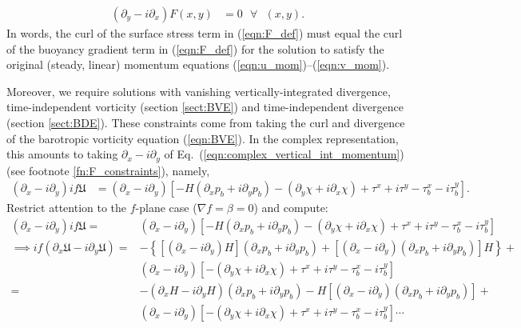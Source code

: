 \documentclass[10pt]{amsart}
\begin{document}
\begin{align}
\left( \partial_y - i \partial_x \right)F(x,y) & = 0 \text{~~} \forall \text{~~} (x,y) .
\end{align}
In words, the curl of the surface stress term in (\ref{eqn:F_def}) must equal the curl of the buoyancy gradient term in (\ref{eqn:F_def}) for the solution to satisfy the original (steady, linear) momentum equations (\ref{eqn:u_mom})--(\ref{eqn:v_mom}).

Moreover, we require solutions with vanishing vertically-integrated divergence, time-independent vorticity (section \ref{sect:BVE}) and time-independent divergence (section \ref{sect:BDE}).
These constraints come from taking the curl and divergence of the barotropic vorticity equation (\ref{eqn:BVE}).
In the complex representation, this amounts to taking $\partial_x - i \partial_y$ of Eq.~(\ref{eqn:complex_vertical_int_momentum}) (see footnote \ref{fn:F_constraints}), namely,
\begin{align}
\left( \partial_x - i \partial_y \right)i f \mathfrak{U} & = \left( \partial_x - i \partial_y \right) \left[- H \left(\partial_x p_b + i \partial_y p_b \right) - \left(\partial_y \chi  + i \partial_x \chi  \right)  + \tau^x + i \tau^y  - \tau^x_b - i \tau^y_b \right].
\end{align}
Restrict attention to the $f$-plane case ($\nabla f = \beta=0$) and compute:
\begin{align}
\left( \partial_x - i \partial_y \right)i f \mathfrak{U} = & \left( \partial_x - i \partial_y \right) \left[- H \left(\partial_x p_b + i \partial_y p_b \right) - \left(\partial_y \chi  + i \partial_x \chi  \right)  + \tau^x + i \tau^y  - \tau^x_b - i \tau^y_b \right] \nonumber \\
\implies
i f \left( \partial_x \mathfrak{U} - i \partial_y \mathfrak{U} \right) = &
-\left\{ \left[\left( \partial_x - i \partial_y \right) H\right] \left(\partial_x p_b + i \partial_y p_b \right) + \left[\left( \partial_x - i \partial_y \right) \left(\partial_x p_b + i \partial_y  p_b  \right) \right] H    \right\}+ \nonumber \\
&\left( \partial_x - i \partial_y \right)\left[- \left(\partial_y \chi  + i \partial_x \chi  \right)  + \tau^x + i \tau^y  - \tau^x_b - i \tau^y_b \right] \nonumber \\
= &
- \left( \partial_x H - i \partial_y H \right) \left(\partial_x p_b + i \partial_y p_b \right) - H  \left[\left( \partial_x - i \partial_y \right) \left(\partial_x p_b + i \partial_y  p_b  \right) \right] + \nonumber \\
&\left( \partial_x - i \partial_y \right)\left[- \left(\partial_y \chi  + i \partial_x \chi  \right)  + \tau^x + i \tau^y  - \tau^x_b - i \tau^y_b \right] \cdots
\end{align}
\end{document}
